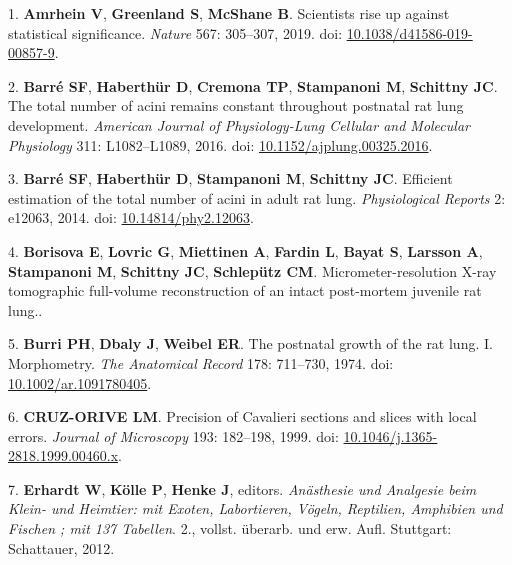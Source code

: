 \documentclass[
  american,
]{article}
\newenvironment{cslreferences}%
  {}%
  {\par}
\begin{document}
\hypertarget{refs}{}
\begin{cslreferences}
\leavevmode\hypertarget{ref-o21zxPIu}{}%
1. \textbf{Amrhein V}, \textbf{Greenland S}, \textbf{McShane B}. Scientists rise up against statistical significance. \emph{Nature} 567: 305--307, 2019. doi: \href{https://doi.org/10.1038/d41586-019-00857-9}{10.1038/d41586-019-00857-9}.

\leavevmode\hypertarget{ref-14OP85b2F}{}%
2. \textbf{Barré SF}, \textbf{Haberthür D}, \textbf{Cremona TP}, \textbf{Stampanoni M}, \textbf{Schittny JC}. The total number of acini remains constant throughout postnatal rat lung development. \emph{American Journal of Physiology-Lung Cellular and Molecular Physiology} 311: L1082--L1089, 2016. doi: \href{https://doi.org/10.1152/ajplung.00325.2016}{10.1152/ajplung.00325.2016}.

\leavevmode\hypertarget{ref-uFNlWogb}{}%
3. \textbf{Barré SF}, \textbf{Haberthür D}, \textbf{Stampanoni M}, \textbf{Schittny JC}. Efficient estimation of the total number of acini in adult rat lung. \emph{Physiological Reports} 2: e12063, 2014. doi: \href{https://doi.org/10.14814/phy2.12063}{10.14814/phy2.12063}.

\leavevmode\hypertarget{ref-Zv1XcgAO}{}%
4. \textbf{Borisova E}, \textbf{Lovric G}, \textbf{Miettinen A}, \textbf{Fardin L}, \textbf{Bayat S}, \textbf{Larsson A}, \textbf{Stampanoni M}, \textbf{Schittny JC}, \textbf{Schlepütz CM}. Micrometer-resolution X-ray tomographic full-volume reconstruction of an intact post-mortem juvenile rat lung..

\leavevmode\hypertarget{ref-auNiE56G}{}%
5. \textbf{Burri PH}, \textbf{Dbaly J}, \textbf{Weibel ER}. The postnatal growth of the rat lung. I. Morphometry. \emph{The Anatomical Record} 178: 711--730, 1974. doi: \href{https://doi.org/10.1002/ar.1091780405}{10.1002/ar.1091780405}.

\leavevmode\hypertarget{ref-FE9HLB4f}{}%
6. \textbf{CRUZ-ORIVE LM}. Precision of Cavalieri sections and slices with local errors. \emph{Journal of Microscopy} 193: 182--198, 1999. doi: \href{https://doi.org/10.1046/j.1365-2818.1999.00460.x}{10.1046/j.1365-2818.1999.00460.x}.

\leavevmode\hypertarget{ref-IdRLVLjl}{}%
7. \textbf{Erhardt W}, \textbf{Kölle P}, \textbf{Henke J}, editors. \emph{Anästhesie und Analgesie beim Klein- und Heimtier: mit Exoten, Labortieren, Vögeln, Reptilien, Amphibien und Fischen ; mit 137 Tabellen}. 2., vollst. überarb. und erw. Aufl. Stuttgart: Schattauer, 2012.


\end{cslreferences}
\end{document}
